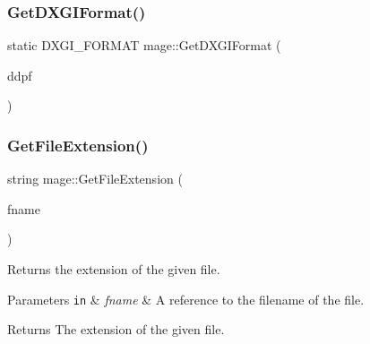 \hypertarget{namespacemage_a4fecf9823aec7c5ba078acf6bd73f983}{}\label{namespacemage_a4fecf9823aec7c5ba078acf6bd73f983} 
\subsubsection{\texorpdfstring{Get\+D\+X\+G\+I\+Format()}{GetDXGIFormat()}}
{\footnotesize\ttfamily static D\+X\+G\+I\+\_\+\+F\+O\+R\+M\+AT mage\+::\+Get\+D\+X\+G\+I\+Format (\begin{DoxyParamCaption}\item[{const \hyperlink{structmage_1_1_d_d_s___p_i_x_e_l_f_o_r_m_a_t}{D\+D\+S\+\_\+\+P\+I\+X\+E\+L\+F\+O\+R\+M\+AT} \&}]{ddpf }\end{DoxyParamCaption})\hspace{0.3cm}{\ttfamily [static]}}

\hypertarget{namespacemage_aec46035d0a6e15632a44ac88619fb675}{}\label{namespacemage_aec46035d0a6e15632a44ac88619fb675} 
\subsubsection{\texorpdfstring{Get\+File\+Extension()}{GetFileExtension()}\hspace{0.1cm}{\footnotesize\ttfamily [1/2]}}
{\footnotesize\ttfamily string mage\+::\+Get\+File\+Extension (\begin{DoxyParamCaption}\item[{const string \&}]{fname }\end{DoxyParamCaption})}

Returns the extension of the given file.


\begin{DoxyParams}[1]{Parameters}
\mbox{\tt in}  & {\em fname} & A reference to the filename of the file. \\
\hline
\end{DoxyParams}
\begin{DoxyReturn}{Returns}
The extension of the given file. 
\end{DoxyReturn}
\hypertarget{namespacemage_ac95841e5c563311d50ef3524d5b7a8d8}{}\label{namespacemage_ac95841e5c563311d50ef3524d5b7a8d8} 
